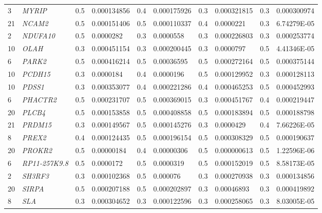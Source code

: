 \begin{refsection}
\begin{otherlanguage}{english}
\begin{scriptsize}
\begin{longtable}{llllllllll}
3 & \cellcolor[HTML]{009901}\textit{MYRIP} & 0.5 & 0.000134856 & 0.4 & 0.000175926 & 0.3 & 0.000321815 & 0.3 & 0.000300974 \\
21 & \cellcolor[HTML]{009901}\textit{NCAM2} & 0.5 & 0.000151406 & 0.5 & 0.000110337 & 0.4 & 0.0000221 & 0.3 & 6.74279E-05 \\
2 & \cellcolor[HTML]{009901}\textit{NDUFA10} & 0.5 & 0.0000282 & 0.3 & 0.0000558 & 0.3 & 0.000226803 & 0.3 & 0.000253774 \\
10 & \cellcolor[HTML]{009901}\textit{OLAH} & 0.3 & 0.000451154 & 0.3 & 0.000200445 & 0.3 & 0.0000797 & 0.5 & 4.41346E-05 \\
6 & \cellcolor[HTML]{009901}\textit{PARK2} & 0.5 & 0.000416214 & 0.5 & 0.00036595 & 0.5 & 0.000272164 & 0.5 & 0.000375144 \\
10 & \cellcolor[HTML]{009901}\textit{PCDH15} & 0.3 & 0.0000184 & 0.4 & 0.0000196 & 0.5 & 0.000129952 & 0.3 & 0.000128113 \\
10 & \cellcolor[HTML]{009901}\textit{PDSS1} & 0.3 & 0.000353077 & 0.4 & 0.000221286 & 0.4 & 0.000465253 & 0.5 & 0.000452993 \\
6 & \cellcolor[HTML]{009901}\textit{PHACTR2} & 0.5 & 0.000231707 & 0.5 & 0.000369015 & 0.3 & 0.000451767 & 0.4 & 0.000219447 \\
20 & \cellcolor[HTML]{009901}\textit{PLCB4} & 0.5 & 0.000153858 & 0.5 & 0.000408858 & 0.5 & 0.000183894 & 0.5 & 0.000188798 \\
21 & \cellcolor[HTML]{009901}\textit{PRDM15} & 0.3 & 0.000149567 & 0.5 & 0.000145276 & 0.3 & 0.0000429 & 0.4 & 7.66226E-05 \\
8 & \cellcolor[HTML]{009901}\textit{PREX2} & 0.4 & 0.000124435 & 0.5 & 0.000196154 & 0.5 & 0.000308329 & 0.5 & 0.000190637 \\
20 & \cellcolor[HTML]{009901}\textit{PROKR2} & 0.5 & 0.00000184 & 0.4 & 0.00000306 & 0.5 & 0.000000613 & 0.5 & 1.22596E-06 \\
6 & \cellcolor[HTML]{009901}\textit{RP11-257K9.8} & 0.5 & 0.0000172 & 0.5 & 0.0000319 & 0.5 & 0.000152019 & 0.5 & 8.58173E-05 \\
2 & \cellcolor[HTML]{009901}\textit{SH3RF3} & 0.3 & 0.000102368 & 0.5 & 0.000076 & 0.3 & 0.000270938 & 0.3 & 0.000134856 \\
20 & \cellcolor[HTML]{009901}\textit{SIRPA} & 0.5 & 0.000207188 & 0.5 & 0.000202897 & 0.3 & 0.00046893 & 0.3 & 0.000419892 \\
8 & \cellcolor[HTML]{009901}\textit{SLA} & 0.3 & 0.000304652 & 0.3 & 0.000122596 & 0.3 & 0.000258065 & 0.3 & 8.03005E-05 \\

\end{longtable}
\end{scriptsize}
\end{otherlanguage}
\end{refsection}
